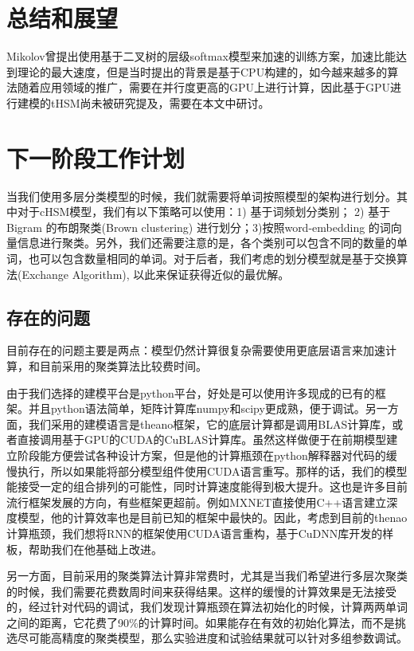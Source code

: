 \documentclass[master,openright,twoside,color]{buaathesis}
\begin{document}



\section{总结和展望}
Mikolov曾提出使用基于二叉树的层级softmax模型来加速的训练方案，加速比能达到理论的最大速度，但是当时提出的背景是基于CPU构建的，如今越来越多的算法随着应用领域的推广，需要在并行度更高的GPU上进行计算，因此基于GPU进行建模的tHSM尚未被研究提及，需要在本文中研讨。
\section{下一阶段工作计划}
当我们使用多层分类模型的时候，我们就需要将单词按照模型的架构进行划分。其中对于cHSM模型，我们有以下策略可以使用：1) 基于词频划分类别； 2) 基于Bigram 的布朗聚类(Brown clustering) 进行划分；3)按照word-embedding 的词向量信息进行聚类。另外，我们还需要注意的是，各个类别可以包含不同的数量的单词，也可以包含数量相同的单词。对于后者，我们考虑的划分模型就是基于交换算法(Exchange Algorithm), 以此来保证获得近似的最优解。

\subsection{存在的问题}
目前存在的问题主要是两点：模型仍然计算很复杂需要使用更底层语言来加速计算，和目前采用的聚类算法比较费时间。

由于我们选择的建模平台是python平台，好处是可以使用许多现成的已有的框架。并且python语法简单，矩阵计算库numpy和scipy更成熟，便于调试。另一方面，我们采用的建模语言是theano框架，它的底层计算都是调用BLAS计算库，或者直接调用基于GPU的CUDA的CuBLAS计算库。虽然这样做便于在前期模型建立阶段能方便尝试各种设计方案，但是他的计算瓶颈在python解释器对代码的缓慢执行，所以如果能将部分模型组件使用CUDA语言重写。那样的话，我们的模型能接受一定的组合排列的可能性，同时计算速度能得到极大提升。这也是许多目前流行框架发展的方向，有些框架更超前。例如MXNET直接使用C++语言建立深度模型，他的计算效率也是目前已知的框架中最快的。因此，考虑到目前的thenao计算瓶颈，我们想将RNN的框架使用CUDA语言重构，基于CuDNN库开发的样板，帮助我们在他基础上改进。

另一方面，目前采用的聚类算法计算非常费时，尤其是当我们希望进行多层次聚类的时候，我们需要花费数周时间来获得结果。这样的缓慢的计算效果是无法接受的，经过针对代码的调试，我们发现计算瓶颈在算法初始化的时候，计算两两单词之间的距离，它花费了90\%的计算时间。如果能存在有效的初始化算法，而不是挑选尽可能高精度的聚类模型，那么实验进度和试验结果就可以针对多组参数调试。
\end{document}
